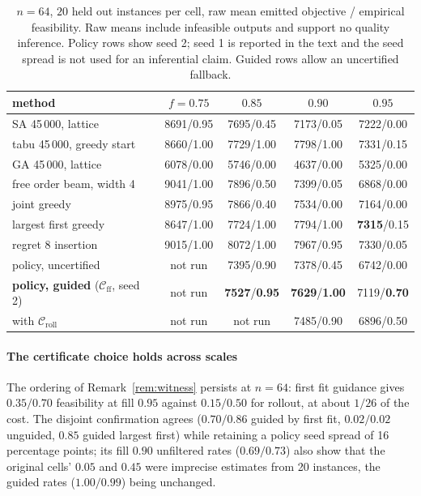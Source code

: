 \documentclass[preprint,12pt,authoryear]{elsarticle}
\newcommand{\cC}{\mathcal{C}}
\begin{document}
\begin{table}[t]
\centering
\caption{$n=64$, $20$ held out instances per cell, raw mean emitted objective /
empirical feasibility. Raw means include infeasible outputs and support no
quality inference. Policy rows show seed 2; seed 1 is reported in the text and the
seed spread is not used for an inferential claim. Guided rows allow an
uncertified fallback.}
\label{tab:n64}
\footnotesize
\setlength{\tabcolsep}{2pt}
\begin{tabular}{@{}lcccc@{}}
\toprule
method & $f{=}0.75$ & $0.85$ & $0.90$ & $0.95$ \\
\midrule
SA 45\,000, lattice        & 8691/0.95 & 7695/0.45 & 7173/0.05 & 7222/0.00 \\
tabu 45\,000, greedy start & 8660/1.00 & 7729/1.00 & 7798/1.00 & 7331/0.15 \\
GA 45\,000, lattice        & 6078/0.00 & 5746/0.00 & 4637/0.00 & 5325/0.00 \\
free order beam, width 4   & 9041/1.00 & 7896/0.50 & 7399/0.05 & 6868/0.00 \\
joint greedy               & 8975/0.95 & 7866/0.40 & 7534/0.00 & 7164/0.00 \\
largest first greedy       & 8647/1.00 & 7724/1.00 & 7794/1.00 & \textbf{7315}/0.15 \\
regret 8 insertion         & 9015/1.00 & 8072/1.00 & 7967/0.95 & 7330/0.05 \\
\midrule
policy, uncertified        & not run & 7395/0.90 & 7378/0.45 & 6742/0.00 \\
\textbf{policy, guided} ($\cC_{\mathrm{ff}}$, seed 2)
                           & not run & \textbf{7527}/\textbf{0.95} & \textbf{7629}/\textbf{1.00} & 7119/\textbf{0.70} \\
\quad with $\cC_{\mathrm{roll}}$ & not run & not run & 7485/0.90 & 6896/0.50 \\
\bottomrule
\end{tabular}
\end{table}

\paragraph{The certificate choice holds across scales}
The ordering of Remark~\ref{rem:witness} persists at $n=64$: first fit
guidance gives $0.35/0.70$ feasibility at fill $0.95$ against $0.15/0.50$ for
rollout, at about $1/26$ of the cost. The disjoint confirmation agrees
($0.70/0.86$ guided by first fit, $0.02/0.02$ unguided, $0.85$ guided
largest first) while retaining a policy seed spread of 16 percentage points; its fill $0.90$
unfiltered rates ($0.69/0.73$) also show that the original cells' $0.05$ and
$0.45$ were imprecise estimates from 20 instances, the guided rates ($1.00/0.99$)
being unchanged.
\end{document}
